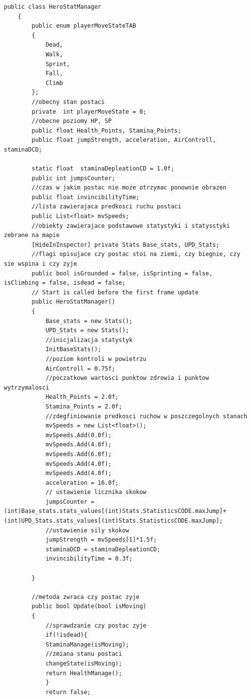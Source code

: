 \documentclass[12pt,twoside]{article}
\begin{document}
\begin{lstlisting}[language={[Sharp]C},caption=Skyrpt HeroStatManager,label={HeroScript:HeroStatManager}]
    public class HeroStatManager
    {
        public enum playerMoveStateTAB
        {
            Dead,
            Walk,
            Sprint,
            Fall,
            Climb
        };
        //obecny stan postaci
        private  int playerMoveState = 0;
        //obecne poziomy HP, SP 
        public float Health_Points, Stamina_Points;
        public float jumpStrength, acceleration, AirControll, staminaDCD;
        
        static float  staminaDepleationCD = 1.0f;
        public int jumpsCounter;
        //czas w jakim postac nie moze otrzymac ponownie obrazen
        public float invincibilityTime;
        //lista zawierajaca predkosci ruchu postaci
        public List<float> mvSpeeds;
        //obiekty zawierajace podstawowe statystyki i statysstyki zebrane na mapie
        [HideInInspector] private Stats Base_stats, UPD_Stats;
        //flagi opisujace czy postac stoi na ziemi, czy biegnie, czy sie wspina i czy zyje
        public bool isGrounded = false, isSprinting = false, isClimbing = false, isdead = false;
        // Start is called before the first frame update
        public HeroStatManager()
        {
            Base_stats = new Stats();
            UPD_Stats = new Stats();
            //inicjalizacja statystyk
            InitBaseStats();
            //poziom kontroli w powietrzu
            AirControll = 0.75f;
            //poczatkowe wartosci punktow zdrowia i punktow wytrzymalosci
            Health_Points = 2.0f;
            Stamina_Points = 2.0f;
            //zdegfiniowanie predkosci ruchow w poszczegolnych stanach
            mvSpeeds = new List<float>();
            mvSpeeds.Add(0.0f);
            mvSpeeds.Add(4.0f);
            mvSpeeds.Add(6.0f);
            mvSpeeds.Add(4.0f);
            mvSpeeds.Add(4.0f);
            acceleration = 16.0f;
            // ustawienie licznika skokow
            jumpsCounter = (int)Base_stats.stats_values[(int)Stats.StatisticsCODE.maxJump]+(int)UPD_Stats.stats_values[(int)Stats.StatisticsCODE.maxJump];
            //ustawienie sily skokow
            jumpStrength = mvSpeeds[1]*1.5f;
            staminaDCD = staminaDepleationCD;
            invincibilityTime = 0.3f;
    
        }
        
        //metoda zwraca czy postac zyje    
        public bool Update(bool isMoving)
        {
            //sprawdzanie czy postac zyje
            if(!isdead){            
            StaminaManage(isMoving);
            //zmiana stanu postaci
            changeState(isMoving);
            return HealthManage();
            }
            return false;
            

\end{lstlisting}
\end{document}
